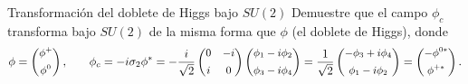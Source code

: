 \begin{Ejercicio}{Transformación del doblete de Higgs bajo $SU(2)$}\label{Ej:21}
Demuestre que el campo $\phi_c$ transforma bajo $SU(2)$ de la misma forma que $\phi$ (el doblete de Higgs), donde
\[ \small
\phi =
\begin{pmatrix}
\phi^+ \\[4pt]
\phi^0
\end{pmatrix},
\qquad
\phi_c = -i\sigma_2 \phi^\ast
= -\frac{i}{\sqrt{2}}
\begin{pmatrix}
0 & -i\\[4pt]
i & 0
\end{pmatrix}
\begin{pmatrix}
\phi_1 - i\phi_2\\[4pt]
\phi_3 - i\phi_4
\end{pmatrix}
=
\frac{1}{\sqrt{2}}
\begin{pmatrix}
-\phi_3 + i\phi_4\\[4pt]
\phi_1 - i\phi_2
\end{pmatrix}
=
\begin{pmatrix}
-\phi^{0\ast}\\[4pt]
\phi^{+\ast}
\end{pmatrix}.
\]
\end{Ejercicio}
